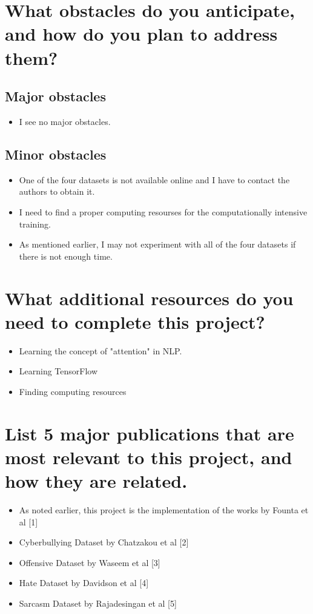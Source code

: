 \documentclass[11pt, twocolumn]{article}
\begin{document}
\section{What obstacles do you anticipate, and how do you plan to address them?}

\subsection{Major obstacles}

\begin{itemize}
  \item I see no major obstacles.
\end{itemize}

\subsection{Minor obstacles}

\begin{itemize}
  \item One of the four datasets is not available online and I have to contact the authors to obtain it.
  \item I need to find a proper computing resourses for the computationally intensive training.
  \item As mentioned earlier, I may not experiment with all of the four datasets if there is not enough time.
\end{itemize}

\section{What additional resources do you need to complete this project?}

\begin{itemize}
  \item Learning the concept of "attention" in NLP.
  \item Learning TensorFlow
  \item Finding computing resources
 \end{itemize}

\section{List 5 major publications that are most relevant to this project, and how they are related.}

\begin{itemize}
\item As noted earlier, this project is the implementation of the works by Founta et al [1]

\item Cyberbullying Dataset by Chatzakou et al [2]

\item Offensive Dataset by Waseem et al [3] 

\item Hate Dataset by Davidson et al [4] 

\item Sarcasm Dataset by Rajadesingan et al [5] 
\end{itemize}
\end{document}
